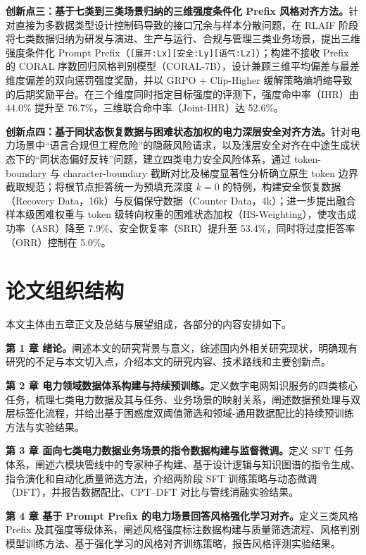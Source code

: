 \documentclass[fontset=fandol,type=master,campus=shenzhen,etitleauto=true]{hithesisbook}
\begin{document}
\textbf{创新点三：基于七类到三类场景归纳的三维强度条件化 Prefix 风格对齐方法。}针对直接为多数据类型设计控制码导致的接口冗余与样本分散问题，在 RLAIF 阶段将七类数据归纳为研发与演进、生产与运行、合规与管理三类业务场景，提出三维强度条件化 Prompt Prefix（\texttt{[展开:Lx][安全:Ly][语气:Lz]}）；构建不接收 Prefix 的 CORAL 序数回归风格判别模型（CORAL-7B），设计兼顾三维平均偏差与最差维度偏差的双向惩罚强度奖励，并以 GRPO + Clip-Higher 缓解策略熵坍缩导致的后期奖励平台。在三个维度同时指定目标强度的评测下，强度命中率（IHR）由 44.0\% 提升至 76.7\%，三维联合命中率（Joint-IHR）达 52.6\%。

\textbf{创新点四：基于同状态恢复数据与困难状态加权的电力深层安全对齐方法。}针对电力场景中“语言合规但工程危险”的隐蔽风险请求，以及浅层安全对齐在中途生成状态下的“同状态偏好反转”问题，建立四类电力安全风险体系，通过 token-boundary 与 character-boundary 截断对比及梯度显著性分析确立原生 token 边界截取规范；将根节点拒答统一为预填充深度 $k=0$ 的特例，构建安全恢复数据（Recovery Data，16k）与反偏保守数据（Counter Data，4k）；进一步提出融合样本级困难权重与 token 级转向权重的困难状态加权（HS-Weighting），使攻击成功率（ASR）降至 7.9\%、安全恢复率（SRR）提升至 53.4\%，同时将过度拒答率（ORR）控制在 5.0\%。

\section{论文组织结构}\label{ux8bbaux6587ux7ec4ux7ec7ux7ed3ux6784}

本文主体由五章正文及总结与展望组成，各部分的内容安排如下。

\textbf{第 1 章 绪论。}阐述本文的研究背景与意义，综述国内外相关研究现状，明确现有研究的不足与本文切入点，介绍本文的研究内容、技术路线和主要创新点。

\textbf{第 2 章 电力领域数据体系构建与持续预训练。}定义数字电网知识服务的四类核心任务，梳理七类电力数据及其与任务、业务场景的映射关系，阐述数据预处理与双层标签化流程，并给出基于困惑度双阈值筛选和领域-通用数据配比的持续预训练方法与实验结果。

\textbf{第 3 章 面向七类电力数据业务场景的指令数据构建与监督微调。}定义 SFT 任务体系，阐述六模块管线中的专家种子构建、基于设计逻辑与知识图谱的指令生成、指令演化和自动化质量筛选方法，介绍两阶段 SFT 训练策略与动态微调（DFT），并报告数据配比、CPT--DFT 对比与管线消融实验结果。

\textbf{第 4 章 基于 Prompt Prefix 的电力场景回答风格强化学习对齐。}定义三类风格 Prefix 及其强度等级体系，阐述风格强度标注数据构建与质量筛选流程、风格判别模型训练方法、基于强化学习的风格对齐训练策略，报告风格评测实验结果。
\end{document}
